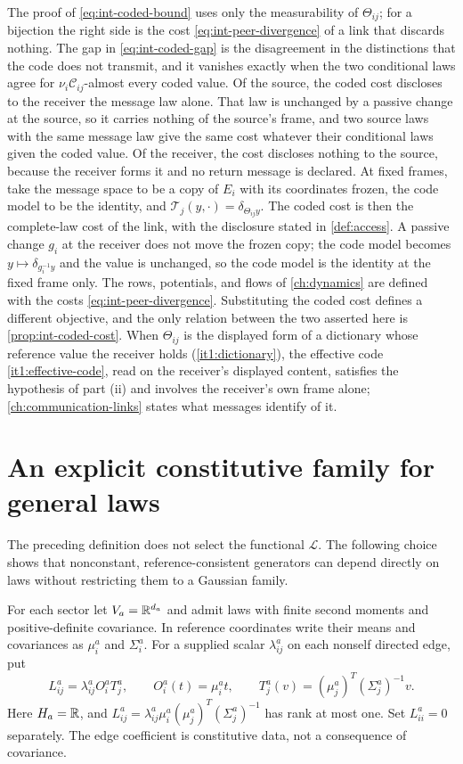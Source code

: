The proof of \cref{eq:int-coded-bound} uses only the measurability of $\Theta_{ij}$; for a bijection the right side is the cost \cref{eq:int-peer-divergence} of a link that discards nothing. The gap in \cref{eq:int-coded-gap} is the disagreement in the distinctions that the code does not transmit, and it vanishes exactly when the two conditional laws agree for $\nu_i\mathcal C_{ij}$-almost every coded value. Of the source, the coded cost discloses to the receiver the message law alone. That law is unchanged by a passive change at the source, so it carries nothing of the source's frame, and two source laws with the same message law give the same cost whatever their conditional laws given the coded value. Of the receiver, the cost discloses nothing to the source, because the receiver forms it and no return message is declared. At fixed frames, take the message space to be a copy of $E_i$ with its coordinates frozen, the code model to be the identity, and $\mathcal T_j(y,\cdot)=\delta_{\Theta_{ij}y}$. The coded cost is then the complete-law cost of the link, with the disclosure stated in \cref{def:access}. A passive change $g_i$ at the receiver does not move the frozen copy; the code model becomes $y\mapsto\delta_{g_i^{-1}y}$ and the value is unchanged, so the code model is the identity at the fixed frame only. The rows, potentials, and flows of \cref{ch:dynamics} are defined with the costs \cref{eq:int-peer-divergence}. Substituting the coded cost defines a different objective, and the only relation between the two asserted here is \cref{prop:int-coded-cost}. When $\Theta_{ij}$ is the displayed form of a dictionary whose reference value the receiver holds (\cref{it1:dictionary}), the effective code \cref{it1:effective-code}, read on the receiver's displayed content, satisfies the hypothesis of part (ii) and involves the receiver's own frame alone; \cref{ch:communication-links} states what messages identify of it.

\section{An explicit constitutive family for general laws}

The preceding definition does not select the functional $\mathcal L$. The following choice shows that nonconstant, reference-consistent generators can depend directly on laws without restricting them to a Gaussian family.

For each sector let $V_a=\mathbb R^{d_a}$ and admit laws with finite second moments and positive-definite covariance. In reference coordinates write their means and covariances as $\mu_i^a$ and $\Sigma_i^a$. For a supplied scalar $\lambda_{ij}^a$ on each nonself directed edge, put
\begin{equation}
L_{ij}^a=\lambda_{ij}^aO_i^aT_j^a,\qquad
O_i^a(t)=\mu_i^a t,\qquad
T_j^a(v)=(\mu_j^a)^T(\Sigma_j^a)^{-1}v.
\label{eq:int-moment-generator}
\end{equation}
Here $H_a=\mathbb R$, and $L_{ij}^a=\lambda_{ij}^a\mu_i^a(\mu_j^a)^T(\Sigma_j^a)^{-1}$ has rank at most one. Set $L_{ii}^a=0$ separately. The edge coefficient is constitutive data, not a consequence of covariance.

